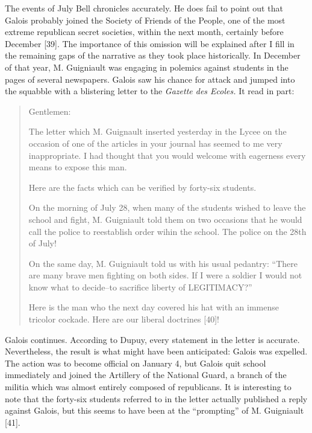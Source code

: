 \documentclass[12pt]{article}
\begin{document}
The events of July Bell chronicles accurately. He does fail to point out that Galois probably joined the Society of Friends of the People, one of the most extreme republican secret societies, within the next month, certainly before December [39]. The importance of this omission will be explained after I fill in the remaining gaps of the narrative as they took place historically. In December of that year, M. Guigniault was engaging in polemics against students in the pages of several newspapers. Galois saw his chance for attack and jumped into the squabble with a blistering letter to the \emph{Gazette des Ecoles.} It read in part:

\begin{quotation}
\noindent
Gentlemen:
\medskip

The letter which M. Guignault inserted yesterday in the Lycee on the occasion of one of the articles in your journal has seemed to me very inappropriate. I had thought that you would welcome with eagerness every means to expose this man.

Here are the facts which can be verified by forty-six students.

On the morning of July 28, when many of the students wished to leave the school and fight, M. Guigniault told them on two occasions that he would call the police to reestablish order wihin the school. The police on the 28th of July!

On the same day, M. Guigniault told us with his usual pedantry: ``There are many brave men fighting on both sides. If I were a soldier I would not know what to decide--to sacrifice liberty of LEGITIMACY?''

Here is the man who the next day covered his hat with an immense tricolor cockade. Here are our liberal doctrines [40]!
\end{quotation}
Galois continues. According to Dupuy, every statement in the letter is accurate. Nevertheless, the result is what might have been anticipated: Galois was expelled. The action was to become official on January 4, but Galois quit school immediately and joined the Artillery of the National Guard, a branch of the militia which was almost entirely composed of republicans. It is interesting to note that the forty-six students referred to in the letter actually published a reply against Galois, but this seems to have been at the ``prompting'' of M. Guigniault [41].
\end{document}
